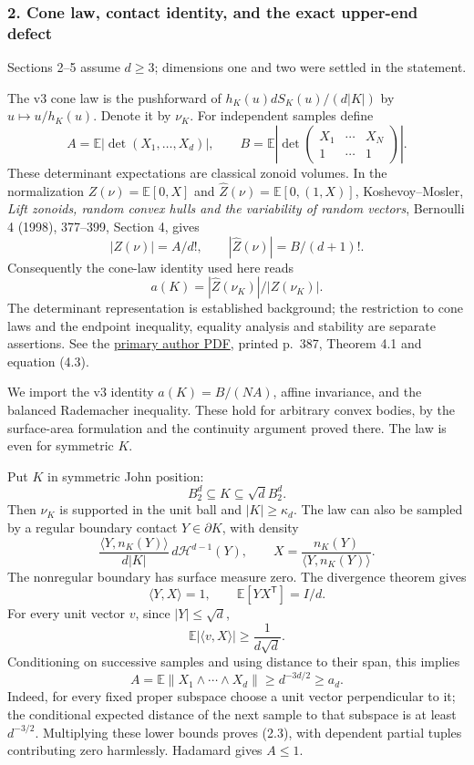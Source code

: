 \documentclass[
  11pt,
]{article}
\begin{document}
\subsubsection{2. Cone law, contact identity, and the exact upper-end
defect}\label{cone-law-contact-identity-and-the-exact-upper-end-defect}

Sections 2--5 assume \(d\ge3\); dimensions one and two were settled in
the statement.

The v3 cone law is the pushforward of \(h_K(u)dS_K(u)/(d|K|)\) by
\(u\mapsto u/h_K(u)\). Denote it by \(\nu_K\). For independent samples
define \[
 A=\mathbb E|\det(X_1,\ldots,X_d)|,
 \qquad
 B=\mathbb E\left|\det\begin{pmatrix}X_1&\cdots&X_N\\1&\cdots&1\end{pmatrix}\right|.
\] These determinant expectations are classical zonoid volumes. In the
normalization \(Z(\nu)=\mathbb E[0,X]\) and
\(\widehat Z(\nu)=\mathbb E[0,(1,X)]\), Koshevoy--Mosler, \emph{Lift
zonoids, random convex hulls and the variability of random vectors},
Bernoulli 4 (1998), 377--399, Section 4, gives \[
 |Z(\nu)|=A/d!,\qquad |\widehat Z(\nu)|=B/(d+1)!.
\] Consequently the cone-law identity used here reads \[
 a(K)=|\widehat Z(\nu_K)|/|Z(\nu_K)|.
\] The determinant representation is established background; the
restriction to cone laws and the endpoint inequality, equality analysis
and stability are separate assertions. See the
\href{https://wisostat.uni-koeln.de/sites/dep_econometrics/pdf_publikationen/1998_KoshevoyM98.pdf}{primary
author PDF}, printed p.~387, Theorem 4.1 and equation (4.3).

We import the v3 identity \(a(K)=B/(NA)\), affine invariance, and the
balanced Rademacher inequality. These hold for arbitrary convex bodies,
by the surface-area formulation and the continuity argument proved
there. The law is even for symmetric \(K\).

Put \(K\) in symmetric John position: \[
 B_2^d\subseteq K\subseteq\sqrt d B_2^d.                          \tag{2.1}
\] Then \(\nu_K\) is supported in the unit ball and \(|K|\ge\kappa_d\).
The law can also be sampled by a regular boundary contact
\(Y\in\partial K\), with density \[
 \frac{\langle Y,n_K(Y)\rangle}{d|K|}\,d\mathcal H^{d-1}(Y),
 \qquad X=\frac{n_K(Y)}{\langle Y,n_K(Y)\rangle}.
\] The nonregular boundary has surface measure zero. The divergence
theorem gives \[
 \langle Y,X\rangle=1,
 \qquad \mathbb E[Y X^{\mathsf T}]=I/d.                          \tag{2.2}
\] For every unit vector \(v\), since \(|Y|\le\sqrt d\), \[
 \mathbb E|\langle v,X\rangle|\ge\frac1{d\sqrt d}.
\] Conditioning on successive samples and using distance to their span,
this implies \[
 A=\mathbb E\|X_1\wedge\cdots\wedge X_d\|
 \ge d^{-3d/2}\ge a_d.                                         \tag{2.3}
\] Indeed, for every fixed proper subspace choose a unit vector
perpendicular to it; the conditional expected distance of the next
sample to that subspace is at least \(d^{-3/2}\). Multiplying these
lower bounds proves (2.3), with dependent partial tuples contributing
zero harmlessly. Hadamard gives \(A\le1\).
\end{document}
